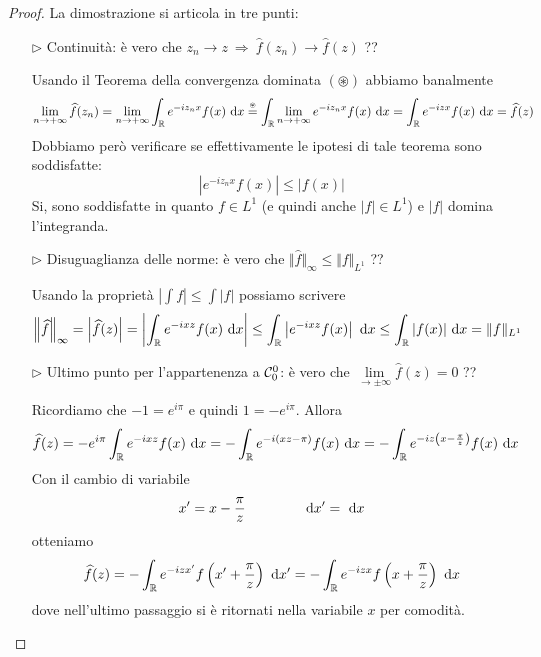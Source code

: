 \begin{proof}
La dimostrazione si articola in tre punti:
\begin{enumerate}
    \item [$\triangleright$] Continuità: è vero che $z_n\to z\ \Rightarrow\ \hat{f}(z_n)\to\hat{f}(z)$ ??

    Usando il Teorema della convergenza dominata $(\circledast)$ abbiamo banalmente
    \begin{equation*}
    \lim\limits_{n\rightarrow + \infty}\widehat{f}(z_n)=\lim\limits_{n\rightarrow + \infty}\int_{\mathbb{R}} e^{- iz_{n} x} f(x) \  \mathrm{d} x \overset{\underset{\circledast}{}}{=} \int_{\mathbb{R}}\lim\limits_{n\rightarrow + \infty} e^{- iz_{n} x} f(x) \  \mathrm{d} x = \int_{\mathbb{R}} e^{- izx} f(x) \  \mathrm{d} x = \widehat{f}(z)
    \end{equation*}
    Dobbiamo però verificare se effettivamente le ipotesi di tale teorema sono soddisfatte:
    \begin{equation*}
    \left| e^{- iz_{n} x} f(x)\right|\leq |f(x)|
    \end{equation*}
    Si, sono soddisfatte in quanto $f\in L^1$ (e quindi anche $|f|\in L^1$) e $|f|$ domina l'integranda.


    \item [$\triangleright$] Disuguaglianza delle norme: è vero che $\Vert \hat{f} \Vert_{\infty} \leq \Vert f \Vert_{L^{1}}$ ??

    Usando la proprietà $\displaystyle\left|\int f\right|\leq \int|f|$ possiamo scrivere
    \begin{equation*}
    \left\Vert \widehat{f} \right\Vert_{\infty} = \left| \widehat{f}(z)\right| = \left| \int_{\mathbb{R}} e^{- ixz} f(x) \  \mathrm{d} x\right| \leq \int_{\mathbb{R}}\left| e^{- ixz} f(x)\right| \  \mathrm{d} x \leq \int_{\mathbb{R}}| f(x)| \  \mathrm{d} x = \Vert f \Vert_{L^{1}}
    \end{equation*}

    \item [$\triangleright$] Ultimo punto per l'appartenenza a $\mathcal{C}_0^0$: è vero che $\lim\limits_{\to \pm \infty}\hat{f}(z) = 0$ ??

    Ricordiamo che $-1=e^{i\pi}$ e quindi $1=-e^{i\pi}$. Allora
    \begin{equation*}
    \widehat{f}(z) = - e^{i\pi}\int_{\mathbb{R}} e^{- ixz} f(x) \  \mathrm{d} x = - \int_{\mathbb{R}} e^{- i(xz - \pi)} f(x) \  \mathrm{d} x = - \int_{\mathbb{R}} e^{- iz\left(x - \frac{\pi}{z}\right)} f(x) \  \mathrm{d} x
    \end{equation*}
    Con il cambio di variabile
    \begin{equation*}
    x' = x - \frac{\pi}{z} \qquad\qquad \  \mathrm{d} x'=\  \mathrm{d} x
    \end{equation*}
    otteniamo
    \begin{equation*}
    \widehat{f}(z) = - \int_{\mathbb{R}} e^{- izx'} f\left(x' + \frac{\pi}{z}\right) \  \mathrm{d} x' = - \int_{\mathbb{R}} e^{- izx} f\left(x + \frac{\pi}{z}\right) \  \mathrm{d} x
    \end{equation*}
    dove nell'ultimo passaggio si è ritornati nella variabile $x$ per comodità.


\end{enumerate}
\end{proof}

